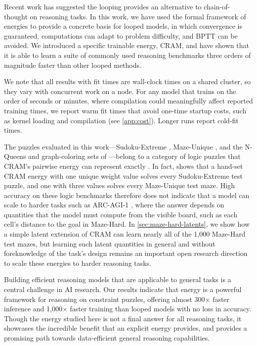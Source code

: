 \documentclass{article}
\newcommand{\CRAM}{\textsc{CRAM}}
\begin{document}
Recent work has suggested the looping provides an alternative to chain-of-thought on reasoning tasks. In this work, we have used the formal framework of energies to provide a concrete basis for looped models, in which convergence is guaranteed, computations can adapt to problem difficulty, and BPTT can be avoided. We introduced a specific trainable energy, \CRAM{}, and have shown that it is able to learn a suite of commonly used reasoning benchmarks three orders of magnitude faster than other looped methods. 

We note that all results with fit times are wall-clock times on a shared cluster, so they vary with concurrent work on a node.
For any model that trains on the order of seconds or minutes, where compilation could meaningfully affect reported training times, we report warm fit times that avoid one-time startup costs, such as kernel loading and compilation (see \cref{app:cost}). Longer runs report cold-fit times. 

The puzzles evaluated in this work---Sudoku-Extreme \citep{hrm2025}, Maze-Unique \citep{eqr2026}, and the N-Queens and graph-coloring sets of \citet{gram2026}---belong to a category of logic puzzles that \CRAM{}'s pairwise energy can represent exactly \citep{hopfieldtank1985,hopfieldsudoku2008}. 
In fact,  shows that a hand-set \CRAM{} energy with one unique weight value solves every Sudoku-Extreme test puzzle, and one with three values solves every Maze-Unique test maze.
High accuracy on these logic benchmarks therefore does not indicate that a model can scale to harder tasks such as ARC-AGI-1 \citep{hrm2025,chollet2019},
where the answer depends on quantities that the model must compute from the visible board, such as each cell's distance to the goal in Maze-Hard.
In \cref{sec:maze-hard-latents}, we show how a simple latent extension of \CRAM{} can learn nearly all of the 1,000 Maze-Hard test mazes, but learning such latent quantities in general and without foreknowledge of the task's design remains an important open research direction to scale these energies to harder reasoning tasks.

%
%

Building efficient reasoning models that are applicable to general tasks is a central challenge in AI research.  
Our results indicate that energy is a powerful framework for reasoning on constraint puzzles, offering almost 300${\times}$ faster inference and 1,000${\times}$ faster training than looped models with no loss in accuracy.
Though the energy studied here is not a final answer for all reasoning tasks, it showcases the incredible benefit that an explicit energy provides, and provides a promising path towards data-efficient general reasoning capabilities.
 \label{main-end}
\ifdefined\SubmissionCopy\else
\end{document}
